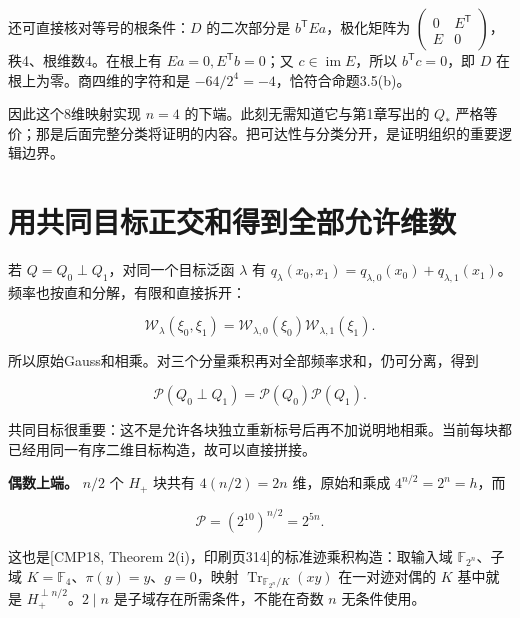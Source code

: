 \documentclass[UTF8,fontset=fandol,zihao=-4,openany,oneside]{ctexbook}
\begin{document}
还可直接核对等号的根条件：\(D\) 的二次部分是 \(b^{\mathsf T}Ea\)，极化矩阵为 \(\begin{pmatrix}0&E^{\mathsf T}\\E&0\end{pmatrix}\)，秩4、根维数4。在根上有 \(Ea=0,E^{\mathsf T}b=0\)；又 \(c\in\operatorname{im}E\)，所以 \(b^{\mathsf T}c=0\)，即 \(D\) 在根上为零。商四维的字符和是 \(-64/2^4=-4\)，恰符合命题3.5(b)。



因此这个8维映射实现 \(n=4\) 的下端。此刻无需知道它与第1章写出的 \(Q_*\) 严格等价；那是后面完整分类将证明的内容。把可达性与分类分开，是证明组织的重要逻辑边界。



\section{用共同目标正交和得到全部允许维数}


若 \(Q=Q_0\perp Q_1\)，对同一个目标泛函 \(\lambda\) 有 \(q_\lambda(x_0,x_1)=q_{\lambda,0}(x_0)+q_{\lambda,1}(x_1)\)。频率也按直和分解，有限和直接拆开：



\[
\mathcal W_\lambda(\xi_0,\xi_1)
=\mathcal W_{\lambda,0}(\xi_0)\mathcal W_{\lambda,1}(\xi_1).
\]



所以原始Gauss和相乘。对三个分量乘积再对全部频率求和，仍可分离，得到



\[
\mathcal P(Q_0\perp Q_1)=\mathcal P(Q_0)\mathcal P(Q_1).
\]



共同目标很重要：这不是允许各块独立重新标号后再不加说明地相乘。当前每块都已经用同一有序二维目标构造，故可以直接拼接。



\textbf{偶数上端。} \(n/2\) 个 \(H_+\) 块共有 \(4(n/2)=2n\) 维，原始和乘成 \(4^{n/2}=2^n=h\)，而



\[
\mathcal P=(2^{10})^{n/2}=2^{5n}.
\]



这也是[CMP18, Theorem 2(i)，印刷页314]的标准迹乘积构造：取输入域 \(\mathbb F_{2^n}\)、子域 \(K=\mathbb F_4\)、\(\pi(y)=y\)、\(g=0\)，映射 \(\operatorname{Tr}_{\mathbb F_{2^n}/K}(xy)\) 在一对迹对偶的 \(K\) 基中就是 \(H_+^{\perp n/2}\)。\(2\mid n\) 是子域存在所需条件，不能在奇数 \(n\) 无条件使用。
\end{document}

